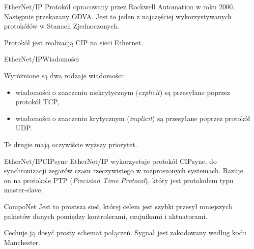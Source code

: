 \documentclass[11pt]{beamer}
\begin{document}
\begin{frame}{EtherNet/IP}
Protokół opracowany przez Rockwell Automation w roku 2000. Następnie przekazany ODVA. Jest to jeden z najczęściej wykorzystywanych protokółów w Stanach Zjednoczonych.

\vspace{0.25cm}

Protokół jest realizacją CIP na sieci Ethernet.
\end{frame}


\begin{frame}{EtherNet/IP}{Wiadomości}

Wyróżnione są dwa rodzaje wiadomości:
\begin{itemize}
\item wiadomości o znaczeniu niekrytycznym (\emph{explicit}) są przesyłane poprzez protokół TCP,
\item wiadomości o znaczeniu krytycznym (\emph{implicit}) są przesyłane poprzez protokół UDP.
\end{itemize}

\medskip

Te drugie mają oczywiście wyższy priorytet.
\end{frame}


\begin{frame}{EtherNet/IP}{CIPsync}
EtherNet/IP wykorzystuje protokół CIPsync, do synchronizacji zegarów czasu rzeczywistego w rozproszonych systemach. Bazuje on na protokole PTP (\emph{Precision Time Protocol}), który jest protokołem typu master-slave.
\end{frame}


\begin{frame}{CompoNet}
Jest to prostsza sieć, której celem jest szybki przesył mniejszych pakietów danych pomiędzy kontrolerami, czujnikami i aktuatorami.

\vspace{0.5cm}

Cechuje ją dosyć prosty schemat połączeń.
Sygnał jest zakodowany według kodu Manchester.
\end{frame}


%
%
%
\end{document}
